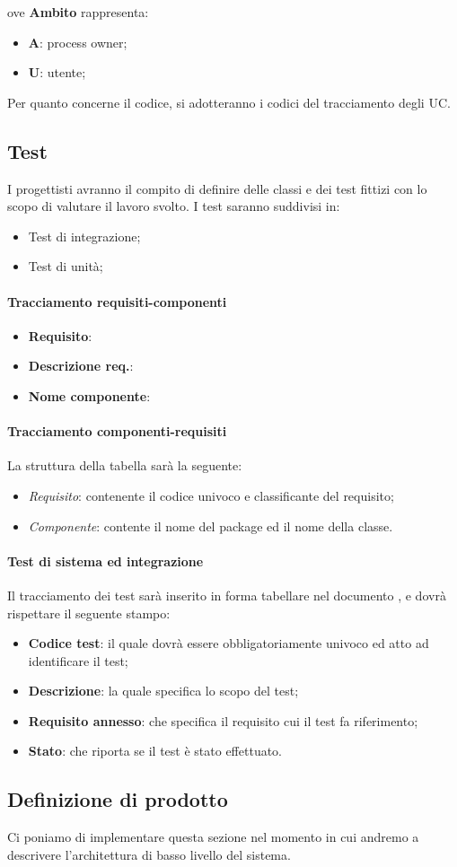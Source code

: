 ove \textbf{Ambito} rappresenta:
\begin{itemize}
\item \textbf{A}: process owner;
\item \textbf{U}: utente;
\end{itemize}

Per quanto concerne il codice, si adotteranno i codici del tracciamento degli UC.

\subsection{Test} I progettisti avranno il compito di definire delle classi e dei test fittizi con lo scopo di valutare il lavoro svolto.
I test saranno suddivisi in:
\begin{itemize}
\item Test di integrazione;
\item Test di unità;
\end{itemize}

\paragraph{Tracciamento requisiti-componenti}

\begin{itemize}
\item \textbf{Requisito}:
\item \textbf{Descrizione req.}:
\item \textbf{Nome componente}:
\end{itemize}

\paragraph{Tracciamento componenti-requisiti}
La struttura della tabella sarà la seguente:
\begin{itemize}
\item \textit{Requisito}: contenente il codice univoco e classificante del requisito;
\item \textit{Componente}: contente il nome del package ed il nome della classe.
\end{itemize}

\paragraph{Test di sistema ed integrazione}
Il tracciamento dei test sarà inserito in forma tabellare nel documento \PianoDiQualifica, e dovrà rispettare il seguente stampo:
\begin{itemize}
\item \textbf{Codice test}: il quale dovrà essere obbligatoriamente univoco ed atto ad identificare il test;
\item \textbf{Descrizione}: la quale specifica lo scopo del test;
\item \textbf{Requisito annesso}: che specifica il requisito cui il test fa riferimento;
\item \textbf{Stato}: che riporta se il test è stato effettuato.
\end{itemize}

\subsection{Definizione di prodotto}
Ci poniamo di implementare questa sezione nel momento in cui andremo a descrivere l'architettura di basso livello del sistema.